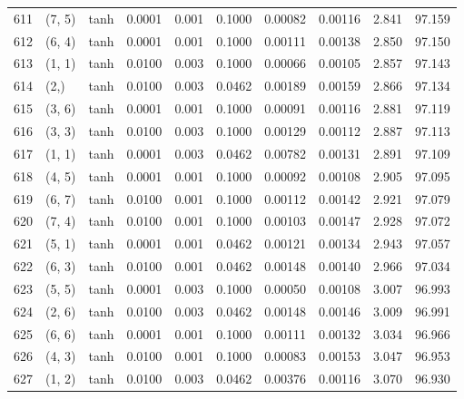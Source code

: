 \begin{tabular}{lllrrrrrrr}
611 &      (7, 5) &      tanh &  0.0001 &  0.001 &  0.1000 &          0.00082 &    0.00116 &       2.841 &    97.159 \\
612 &      (6, 4) &      tanh &  0.0001 &  0.001 &  0.1000 &          0.00111 &    0.00138 &       2.850 &    97.150 \\
613 &      (1, 1) &      tanh &  0.0100 &  0.003 &  0.1000 &          0.00066 &    0.00105 &       2.857 &    97.143 \\
614 &        (2,) &      tanh &  0.0100 &  0.003 &  0.0462 &          0.00189 &    0.00159 &       2.866 &    97.134 \\
615 &      (3, 6) &      tanh &  0.0001 &  0.001 &  0.1000 &          0.00091 &    0.00116 &       2.881 &    97.119 \\
616 &      (3, 3) &      tanh &  0.0100 &  0.003 &  0.1000 &          0.00129 &    0.00112 &       2.887 &    97.113 \\
617 &      (1, 1) &      tanh &  0.0001 &  0.003 &  0.0462 &          0.00782 &    0.00131 &       2.891 &    97.109 \\
618 &      (4, 5) &      tanh &  0.0001 &  0.001 &  0.1000 &          0.00092 &    0.00108 &       2.905 &    97.095 \\
619 &      (6, 7) &      tanh &  0.0100 &  0.001 &  0.1000 &          0.00112 &    0.00142 &       2.921 &    97.079 \\
620 &      (7, 4) &      tanh &  0.0100 &  0.001 &  0.1000 &          0.00103 &    0.00147 &       2.928 &    97.072 \\
621 &      (5, 1) &      tanh &  0.0001 &  0.001 &  0.0462 &          0.00121 &    0.00134 &       2.943 &    97.057 \\
622 &      (6, 3) &      tanh &  0.0100 &  0.001 &  0.0462 &          0.00148 &    0.00140 &       2.966 &    97.034 \\
623 &      (5, 5) &      tanh &  0.0001 &  0.003 &  0.1000 &          0.00050 &    0.00108 &       3.007 &    96.993 \\
624 &      (2, 6) &      tanh &  0.0100 &  0.003 &  0.0462 &          0.00148 &    0.00146 &       3.009 &    96.991 \\
625 &      (6, 6) &      tanh &  0.0001 &  0.001 &  0.1000 &          0.00111 &    0.00132 &       3.034 &    96.966 \\
626 &      (4, 3) &      tanh &  0.0100 &  0.001 &  0.1000 &          0.00083 &    0.00153 &       3.047 &    96.953 \\
627 &      (1, 2) &      tanh &  0.0100 &  0.003 &  0.0462 &          0.00376 &    0.00116 &       3.070 &    96.930 \\

\end{tabular}
